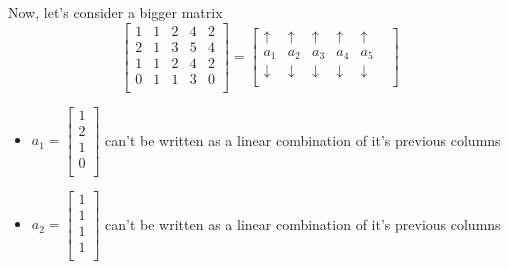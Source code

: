 \documentclass{article}
\begin{document}
Now, let's consider a bigger matrix\\
$$
  \begin{bmatrix}
    1 & 1 & 2 & 4 & 2 \\
    2 & 1 & 3 & 5 & 4 \\
    1 & 1 & 2 & 4 & 2 \\
    0 & 1 & 1 & 3 & 0 \\
  \end{bmatrix}=\begin{bmatrix}
    \uparrow &\uparrow &\uparrow&\uparrow&\uparrow \\
    a_1 & a_2 & a_3 & a_4 & a_5 &   \\
    \downarrow &\downarrow&\downarrow&\downarrow&\downarrow \\
  \end{bmatrix}
$$
\begin{itemize}
  \item $a_1=
          \begin{bmatrix}
            1 \\
            2 \\
            1 \\
            0 \\
          \end{bmatrix}
        $ can't be written as a linear combination of it's previous columns

  \item $a_2=
          \begin{bmatrix}
            1 \\
            1 \\
            1 \\
            1 \\
          \end{bmatrix}
        $ can't be written as a linear combination of it's previous columns


\end{itemize}
\end{document}

